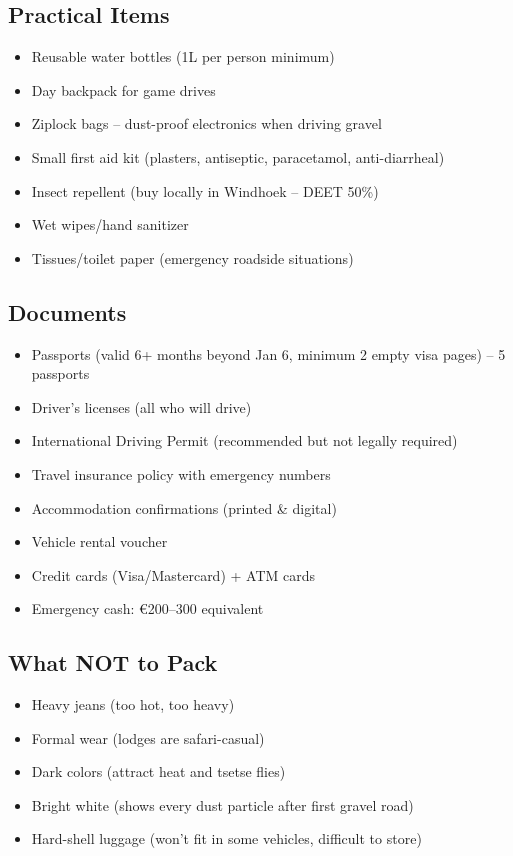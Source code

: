 \documentclass[11pt]{article}
\begin{document}
\subsection{Practical Items}

\begin{itemize}
    \item Reusable water bottles (1L per person minimum)
    \item Day backpack for game drives
    \item Ziplock bags -- dust-proof electronics when driving gravel
    \item Small first aid kit (plasters, antiseptic, paracetamol, anti-diarrheal)
    \item Insect repellent (buy locally in Windhoek -- DEET 50\%)
    \item Wet wipes/hand sanitizer
    \item Tissues/toilet paper (emergency roadside situations)
\end{itemize}

\subsection{Documents}

\begin{itemize}
    \item Passports (valid 6+ months beyond Jan 6, minimum 2 empty visa pages) -- 5 passports
    \item Driver's licenses (all who will drive)
    \item International Driving Permit (recommended but not legally required)
    \item Travel insurance policy with emergency numbers
    \item Accommodation confirmations (printed \& digital)
    \item Vehicle rental voucher
    \item Credit cards (Visa/Mastercard) + ATM cards
    \item Emergency cash: €200--300 equivalent
\end{itemize}

\subsection{What NOT to Pack}

\begin{itemize}
    \item Heavy jeans (too hot, too heavy)
    \item Formal wear (lodges are safari-casual)
    \item Dark colors (attract heat and tsetse flies)
    \item Bright white (shows every dust particle after first gravel road)
    \item Hard-shell luggage (won't fit in some vehicles, difficult to store)
\end{itemize}
\end{document}
